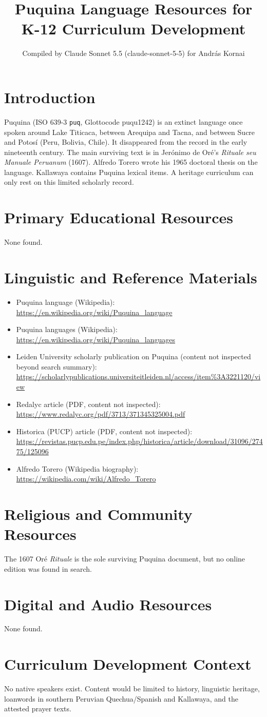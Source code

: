 \documentclass[12pt]{article}
\title{Puquina Language Resources for K-12 Curriculum Development}
\author{Compiled by Claude Sonnet 5.5 (claude-sonnet-5-5) for Andr\'as Kornai}
\date{}
\begin{document}
\maketitle

\section{Introduction}
Puquina (ISO 639-3 \texttt{puq}, Glottocode puqu1242) is an extinct language once spoken around Lake Titicaca, between Arequipa and Tacna, and between Sucre and Potos\'i (Peru, Bolivia, Chile). It disappeared from the record in the early nineteenth century. The main surviving text is in Jer\'onimo de Or\'e's \emph{Rituale seu Manuale Peruanum} (1607). Alfredo Torero wrote his 1965 doctoral thesis on the language. Kallawaya contains Puquina lexical items. A heritage curriculum can only rest on this limited scholarly record.

\section{Primary Educational Resources}
None found.

\section{Linguistic and Reference Materials}
\begin{itemize}
\item Puquina language (Wikipedia): \url{https://en.wikipedia.org/wiki/Puquina_language}
\item Puquina languages (Wikipedia): \url{https://en.wikipedia.org/wiki/Puquina_languages}
\item Leiden University scholarly publication on Puquina (content not inspected beyond search summary): \url{https://scholarlypublications.universiteitleiden.nl/access/item%3A3221120/view}
\item Redalyc article (PDF, content not inspected): \url{https://www.redalyc.org/pdf/3713/371345325004.pdf}
\item Historica (PUCP) article (PDF, content not inspected): \url{https://revistas.pucp.edu.pe/index.php/historica/article/download/31096/27475/125096}
\item Alfredo Torero (Wikipedia biography): \url{https://wikipedia.com/wiki/Alfredo_Torero}
\end{itemize}

\section{Religious and Community Resources}
The 1607 Or\'e \emph{Rituale} is the sole surviving Puquina document, but no online edition was found in search.

\section{Digital and Audio Resources}
None found.

\section{Curriculum Development Context}
No native speakers exist. Content would be limited to history, linguistic heritage, loanwords in southern Peruvian Quechua/Spanish and Kallawaya, and the attested prayer texts.
\end{document}
